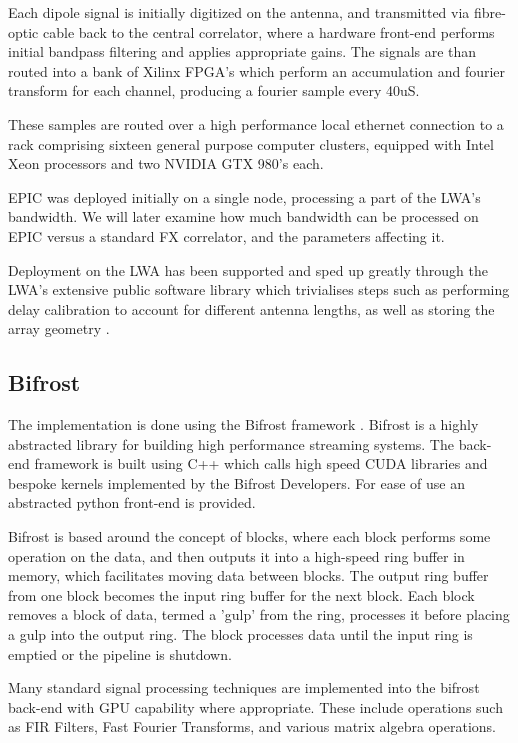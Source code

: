 \documentclass[bibliography=totocnumbered, twocolumn]{article}
\begin{document}
Each dipole signal is initially digitized on the antenna, and transmitted via
fibre-optic cable back to the central correlator, where a hardware
front-end performs initial bandpass filtering and applies
appropriate gains. The signals are than routed into a bank of
Xilinx FPGA's which perform an accumulation and fourier transform
for each channel, producing a fourier sample every 40uS.

These samples are routed over a high performance local ethernet
connection to a rack comprising sixteen general purpose computer
clusters, equipped with Intel Xeon processors and two NVIDIA GTX 980's
each.

EPIC was deployed initially on a single node, processing a part of
the LWA's bandwidth. We will later examine how much bandwidth can
be processed on EPIC versus a standard FX correlator, and the parameters
affecting it.

Deployment on the LWA has been supported and sped up greatly through
the LWA's extensive public software library which trivialises steps such as
performing delay calibration to account for different antenna lengths,
as well as storing the array geometry \citep{dowell_long_2012}.

\subsection{Bifrost}

The implementation is done using the Bifrost framework
\citep{cranmer_bifrost:_2017}. Bifrost is a highly abstracted library
for building high performance streaming systems. The back-end
framework is built using C++ which calls high speed CUDA libraries
and bespoke kernels implemented by the Bifrost Developers. For
ease of use an abstracted python front-end is provided.

Bifrost is based around the concept of blocks, where each block performs
some operation on the data, and then outputs it into a high-speed
ring buffer in memory, which facilitates moving data between blocks.
The output ring buffer from one block becomes the input ring buffer
for the next block. Each block removes a block of data, termed a
'gulp' from the ring, processes it before placing a gulp into
the output ring. The block processes data until the input ring is emptied
or the pipeline is shutdown.

Many standard signal processing techniques are implemented into
the bifrost back-end with GPU capability where appropriate. These
include operations such as FIR Filters, Fast Fourier Transforms,
and various matrix algebra operations.
\end{document}
